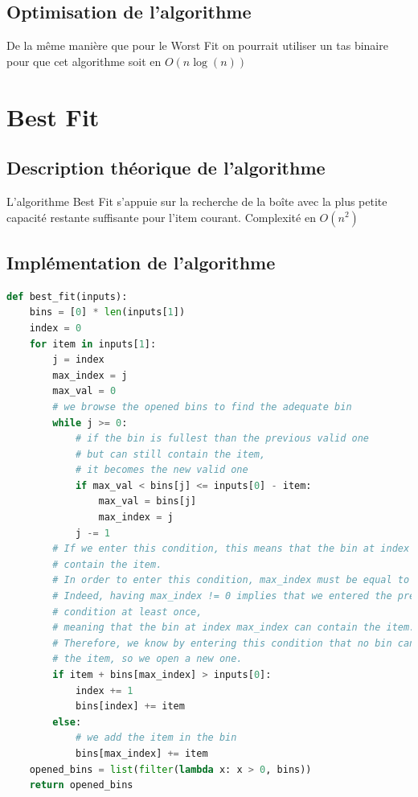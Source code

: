 \documentclass{article}
\begin{document}
\subsection{Optimisation de l'algorithme}
De la même manière que pour le Worst Fit on pourrait utiliser un tas binaire pour que cet algorithme soit en $O(n\log(n))$



\section{Best Fit}
\subsection{Description théorique de l'algorithme}
L'algorithme Best Fit s'appuie sur la recherche de la boîte avec la plus petite capacité restante suffisante pour l'item courant.
Complexité en $O(n^2)$

\subsection{Implémentation de l'algorithme}
\begin{lstlisting}[language=Python, frame=single]
def best_fit(inputs):
    bins = [0] * len(inputs[1])
    index = 0
    for item in inputs[1]:
        j = index
        max_index = j
        max_val = 0
        # we browse the opened bins to find the adequate bin
        while j >= 0:
            # if the bin is fullest than the previous valid one
            # but can still contain the item,
            # it becomes the new valid one
            if max_val < bins[j] <= inputs[0] - item:
                max_val = bins[j]
                max_index = j
            j -= 1
        # If we enter this condition, this means that the bin at index max_index cannot
        # contain the item.
        # In order to enter this condition, max_index must be equal to 0.
        # Indeed, having max_index != 0 implies that we entered the precedent if
        # condition at least once,
        # meaning that the bin at index max_index can contain the item.
        # Therefore, we know by entering this condition that no bin can contain
        # the item, so we open a new one.
        if item + bins[max_index] > inputs[0]:
            index += 1
            bins[index] += item
        else:
            # we add the item in the bin
            bins[max_index] += item
    opened_bins = list(filter(lambda x: x > 0, bins))
    return opened_bins
\end{lstlisting}
\end{document}
